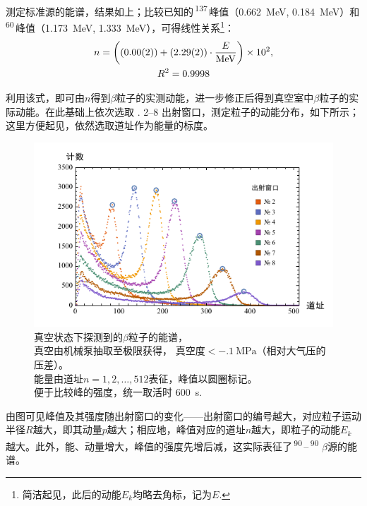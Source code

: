 \documentclass[aps,pre,12pt,preprint,%
	onecolumn,showpacs,showkeys,nofootinbib]{revtex4-1}
\newcommand{\SrAtom}{\,\textsuperscript{90}\tup{Sr}\,}
\newcommand{\Yatom}{\,\textsuperscript{90}\tup{Y}\,}
\newcommand{\CsAtom}{\,\textsuperscript{137}\tup{Cs}\,}
\newcommand{\CoAtom}{\,\textsuperscript{60}\tup{Cs}\,}
\begin{document}
	测定标准源的能谱，结果如上；比较已知的\CsAtom 峰值（\SI{.662}{\MeV}, \SI{.184}{\MeV}）和\CoAtom 峰值（\SI{1.173}{\MeV}, \SI{1.333}{\MeV}），可得线性关系\footnote{%
		简洁起见，此后的动能$E_k$均略去角标，记为$E$. }：
	\begin{equation}
	\begin{gathered}
		n = \pqty{
			(\num{.00(2)})
			+ (\num{2.29(2)})\cdot\frac{E}{\si{\MeV}}
			}\times\num{e2},\\
		R^2 = \num{,9998}
	\end{gathered}
	\end{equation}
	
	利用该式，即可由$n$得到$\beta$粒子的实测动能，进一步修正后得到真空室中$\beta$粒子的实际动能。在此基础上依次选取 \textnumero. \numrange{2}{8} 出射窗口，测定粒子的动能分布，如下所示；这里方便起见，依然选取道址作为能量的标度。
	
	\begin{figure}[!h]
	\centering
	\vspace{5ex}
	\includegraphics[width=\linewidth]{vacPlot.pdf}
	\caption[真空β能谱]{真空状态下探测到的$\beta$粒子的能谱，\\
	真空由机械泵抽取至极限获得，
	真空度$<\SI{-.1}{\MPa}$（相对大气压的压差）。\\
	能量由道址$n = 1,2,\dots,512$表征，峰值以圆圈标记。\\
	便于比较峰的强度，统一取活时 \SI{600}{\s}. }
	\label{fig:vacPlot}
	\end{figure}
	
	由图可见峰值及其强度随出射窗口的变化——出射窗口的编号越大，对应粒子运动半径$R$越大，即其动量$p$越大；相应地，峰值对应的道址$n$越大，即粒子的动能$E_k$越大。此外，能、动量增大，峰值的强度先增后减，这实际表征了\SrAtom--\Yatom\,$\beta$源的能谱。
	
\end{document}
